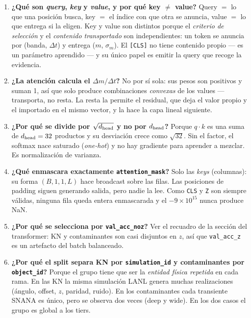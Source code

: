 \documentclass[11pt,a4paper]{article}
\newcommand{\code}[1]{\texttt{\small #1}}
\begin{document}
\begin{enumerate}[itemsep=3pt]
\item \textbf{¿Qué son \emph{query}, \emph{key} y \emph{value}, y por qué key $\ne$ value?}
      Query $=$ lo que una posición busca, key $=$ el índice con que otra se anuncia, value $=$ lo
      que entrega si la eligen. Key y value son distintos porque el \emph{criterio de selección} y el
      \emph{contenido transportado} son independientes: un token se anuncia por (banda, $\Delta t$) y
      entrega ($m$, $\sigma_m$). El \code{[CLS]} no tiene contenido propio --- es un parámetro
      aprendido --- y su único papel es emitir la query que recoge la evidencia.

\item \textbf{¿La atención calcula el $\Delta m/\Delta t$?}
      No por sí sola: sus pesos son positivos y suman 1, así que solo produce combinaciones
      \emph{convexas} de los values --- transporta, no resta. La resta la permite el residual, que
      deja el valor propio y el importado en el mismo vector, y la hace la capa lineal siguiente.

\item \textbf{¿Por qué se divide por $\sqrt{d_{\rm head}}$ y no por $d_{\rm head}$?}
      Porque $q\cdot k$ es una suma de $d_{\rm head}=32$ productos y su desviación crece como
      $\sqrt{32}$. Sin el factor, el softmax nace saturado (\emph{one-hot}) y no hay gradiente para
      aprender a mezclar. Es normalización de varianza.

\item \textbf{¿Qué enmascara exactamente \code{attention\_mask}?}
      Solo las \emph{keys} (columnas): su forma $(B,1,1,L)$ hace broadcast sobre las filas. Las
      posiciones de padding siguen generando salida, pero nadie la lee. Como \code{CLS} y \code{Z}
      son siempre válidas, ninguna fila queda entera enmascarada y el $-9\times10^{15}$ nunca produce
      NaN.

\item \textbf{¿Por qué se selecciona por \code{val\_acc\_noz}?}
      Ver el recuadro de la sección del transformer: KN y contaminantes son casi disjuntos en $z$,
      así que \code{val\_acc\_z} es un artefacto del batch balanceado.

\item \textbf{¿Por qué el split separa KN por \code{simulation\_id} y contaminantes por
      \code{object\_id}?}
      Porque el grupo tiene que ser la \emph{entidad física repetida} en cada rama. En las KN la
      misma simulación LANL genera muchas realizaciones (ángulo, offset, $z$, paridad, ruido). En
      los contaminantes cada transiente SNANA es único, pero se observa dos veces (deep y wide).
      En los dos casos el grupo es global a los tiers.


\end{enumerate}
\end{document}
